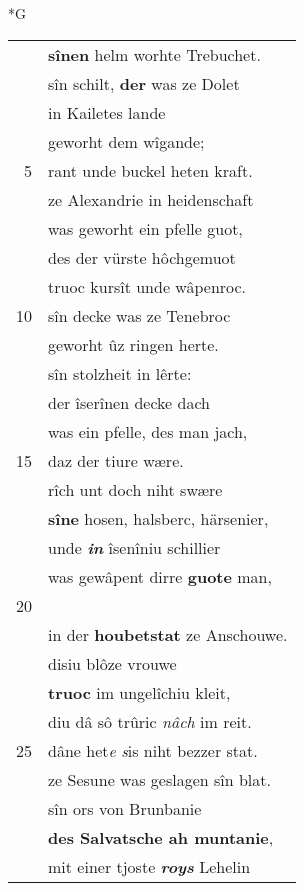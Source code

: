 \documentclass[8pt,a4paper,notitlepage]{article}
\begin{document}
\newpage
\begin{table}[ht]
\begin{minipage}[t]{0.5\linewidth}
\small
\begin{center}*G
\end{center}
\begin{tabular}{rl}
 & \textbf{sînen} helm worhte Trebuchet.\\ 
 & sîn schilt, \textbf{der} was ze Dolet\\ 
 & in Kailetes lande\\ 
 & geworht dem wîgande;\\ 
5 & rant unde buckel heten kraft.\\ 
 & ze Alexandrie in heidenschaft\\ 
 & was geworht ein pfelle guot,\\ 
 & des der vürste hôchgemuot\\ 
 & truoc kursît unde wâpenroc.\\ 
10 & sîn decke was ze Tenebroc\\ 
 & geworht ûz ringen herte.\\ 
 & sîn stolzheit in lêrte:\\ 
 & der îserînen decke dach\\ 
 & was ein pfelle, des man jach,\\ 
15 & daz der tiure wære.\\ 
 & rîch unt doch niht swære\\ 
 & \textbf{sîne} hosen, halsberc, härsenier,\\ 
 & unde \textit{\textbf{in}} îsenîniu schillier\\ 
 & was gewâpent dirre \textbf{guote} man,\\ 
20 & \textit{\begin{large}G\end{large}}eworht \textbf{ze} Belzanan,\\ 
 & in der \textbf{houbetstat} ze Anschouwe.\\ 
 & disiu blôze vrouwe\\ 
 & \textbf{truoc} im ungelîchiu kleit,\\ 
 & diu dâ sô trûric \textit{nâch} im reit.\\ 
25 & dâne het\textit{e} \textit{s}is niht bezzer stat.\\ 
 & ze Sesune was geslagen sîn blat.\\ 
 & sîn ors von Brunbanie\\ 
 & \textbf{des Salvatsche ah muntanie},\\ 
 & mit einer tjoste \textit{\textbf{roys}} Lehelin\\ 

\end{tabular}
\end{minipage}
\end{table}
\end{document}
